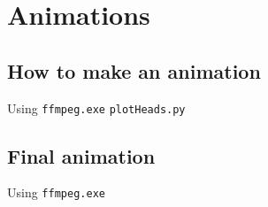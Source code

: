 \documentclass[t]{beamer}
\begin{document}
\section{Animations}
\subsection{How to make an animation}
\begin{frame}{Using \texttt{ffmpeg.exe}}
\small{\texttt{plotHeads.py}}
	\vspace{-15pt}\begin{figure}[ht]
		\centering
	        \lstset{numbers=left}
	        
	        
	\end{figure}
\end{frame}

\subsection{Final animation}
\begin{frame}{Using \texttt{ffmpeg.exe}}
	\begin{center}
	\end{center}
\end{frame}
\end{document}
